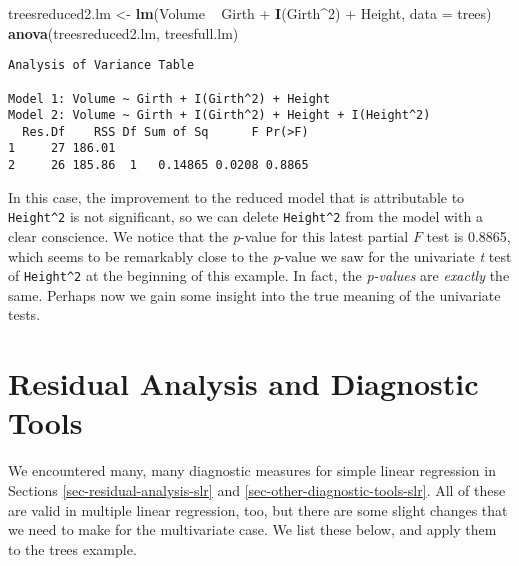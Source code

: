 \documentclass[]{book}
\newenvironment{Shaded}{\begin{snugshade}}{\end{snugshade}}
\newcommand{\KeywordTok}[1]{\textcolor[rgb]{0.13,0.29,0.53}{\textbf{{#1}}}}
\newcommand{\DataTypeTok}[1]{\textcolor[rgb]{0.13,0.29,0.53}{{#1}}}
\newcommand{\DecValTok}[1]{\textcolor[rgb]{0.00,0.00,0.81}{{#1}}}
\newcommand{\StringTok}[1]{\textcolor[rgb]{0.31,0.60,0.02}{{#1}}}
\newcommand{\NormalTok}[1]{{#1}}
\numberwithin{equation}{chapter}
\numberwithin{figure}{chapter}
\theoremstyle{plain}
\theoremstyle{definition}
\theoremstyle{remark}
\theoremstyle{definition}
\theoremstyle{definition}
\theoremstyle{remark}
\begin{document}
\begin{Shaded}
\begin{Highlighting}[]
\NormalTok{treesreduced2.lm <-}\StringTok{ }\KeywordTok{lm}\NormalTok{(Volume ~}\StringTok{ }\NormalTok{Girth +}\StringTok{ }\KeywordTok{I}\NormalTok{(Girth^}\DecValTok{2}\NormalTok{) +}\StringTok{ }\NormalTok{Height, }
                       \DataTypeTok{data =} \NormalTok{trees)}
\KeywordTok{anova}\NormalTok{(treesreduced2.lm, treesfull.lm)}
\end{Highlighting}
\end{Shaded}

\begin{verbatim}
Analysis of Variance Table

Model 1: Volume ~ Girth + I(Girth^2) + Height
Model 2: Volume ~ Girth + I(Girth^2) + Height + I(Height^2)
  Res.Df    RSS Df Sum of Sq      F Pr(>F)
1     27 186.01                           
2     26 185.86  1   0.14865 0.0208 0.8865
\end{verbatim}

In this case, the improvement to the reduced model that is attributable
to \texttt{Height\^{}2} is not significant, so we can delete
\texttt{Height\^{}2} from the model with a clear conscience. We notice
that the \emph{p}-value for this latest partial \(F\) test is 0.8865,
which seems to be remarkably close to the \emph{p}-value we saw for the
univariate \emph{t} test of \texttt{Height\^{}2} at the beginning of
this example. In fact, the \emph{p-values} are \emph{exactly} the same.
Perhaps now we gain some insight into the true meaning of the univariate
tests.

\section{Residual Analysis and Diagnostic
Tools}\label{sec-residual-analysis-mlr}

We encountered many, many diagnostic measures for simple linear
regression in Sections \ref{sec-residual-analysis-slr} and
\ref{sec-other-diagnostic-tools-slr}. All of these are valid in multiple
linear regression, too, but there are some slight changes that we need
to make for the multivariate case. We list these below, and apply them
to the trees example.
\end{document}
